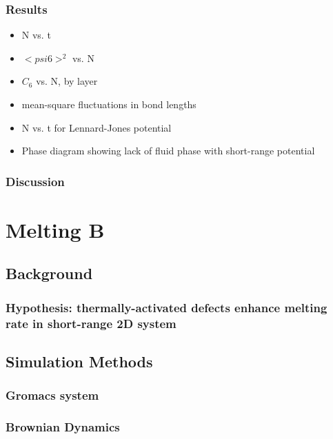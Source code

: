 \documentclass{umthesis}
\begin{document}
\subsection{Results}
\label{sec-1.3.6}
\begin{itemize}

\item N vs. t\\
\label{sec-1.3.6.1}%
\item $< psi6 >^2$ vs. N\\
\label{sec-1.3.6.2}%
\item $C_6$ vs. N, by layer\\
\label{sec-1.3.6.3}%
\item mean-square fluctuations in bond lengths\\
\label{sec-1.3.6.4}%
\item N vs. t for Lennard-Jones potential\\
\label{sec-1.3.6.5}%
\item Phase diagram showing lack of fluid phase with short-range potential\\
\label{sec-1.3.6.6}%
\end{itemize} %
\subsection{Discussion}
\label{sec-1.3.7}
\chapter{Melting B}
\label{sec-2}
\section{Background}
\label{sec-2.1}
\subsection{Hypothesis: thermally-activated defects enhance melting rate in short-range 2D system}
\label{sec-2.1.1}
\section{Simulation Methods}
\label{sec-2.2}
\subsection{Gromacs system}
\label{sec-2.2.1}
\subsection{Brownian Dynamics}
\label{sec-2.2.2}
\end{document}
